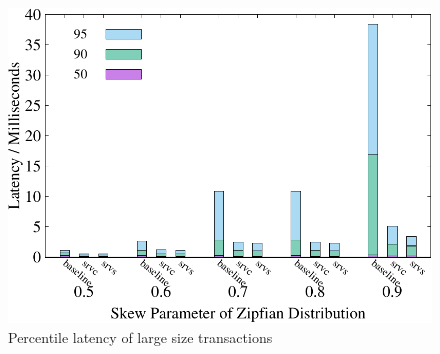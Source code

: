 \begin{figure}[t]
\begin{minipage}[b]{0.32\linewidth}
        \label{fig:weighted:abort1}
    \end{minipage}
    \begin{minipage}[b]{0.32\linewidth}
        \centering
        \includegraphics[width=\textwidth]{./exp_fig/weighted_size/percent95_latency_1}
        \vspace{-2em}
        \caption{Percentile latency of large size transactions}
        \label{fig:weighted:p951}
    \end{minipage}
\end{figure}



